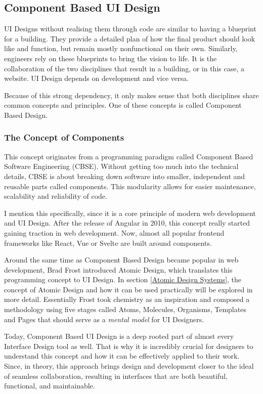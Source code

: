\newpage
\subsection{Component Based UI Design}
UI Designs without realising them through code are similar to having a blueprint for a building.
They provide a detailed plan of how the final product should look like and function, but remain
mostly nonfunctional on their own. Similarly, engineers rely on these blueprints to bring the vision
to life. It is the collaboration of the two disciplines that result in a building, or in this case,
a website. UI Design depends on development and vice versa. 

Because of this strong dependency, it only makes sense that both disciplines share common concepts
and principles. One of these concepts is called Component Based Design.

\subsubsection{The Concept of Components}
This concept originates from a programming paradigm called Component Based Software Engineering
(CBSE). Without getting too much into the technical details, CBSE is about breaking down software
into smaller, independent and reusable parts called components. This modularity allows for easier
maintenance, scalability and reliability of code.

I mention this specifically, since it is a core principle of modern web development and UI Design.
After the release of Angular in 2010, this concept really started gaining traction in web
development. 
Now, almost all popular frontend frameworks like React, Vue or Svelte are built around components.
  

Around the same time as Component Based Design became popular in web development, Brad Frost
introduced Atomic Design, which translates this programming concept to UI Design. In section
\ref{Atomic Design Systems}, the concept of Atomic Design and how it can be used practically will be
explored in more detail. Essentially Frost took chemistry as an inspiration and composed a methodology
using five stages called Atoms, Molecules, Organisms, Templates and Pages that should serve as a
\textit{mental model} for UI Designers. 

Today, Component Based UI Design is a deep rooted part of almost every Interface Design tool as
well. That is why it is incredibly crucial for designers to understand this concept and how it can
be effectively applied to their work. Since, in theory, this approach brings design and development
closer to the ideal of seamless collaboration, resulting in interfaces that are both beautiful,
functional, and maintainable.